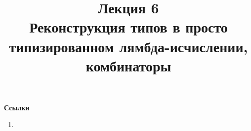 \documentclass[12pt, a4paper]{article}
\begin{document}
	\begin{titlepage}
		\title{Лекция 6 \\ Реконструкция типов в просто типизированном лямбда-исчислении, комбинаторы}
		\date{}
	\end{titlepage}
		\maketitle
\textbf{Ссылки}
\begin{enumerate}
	\item
\end{enumerate}
\end{document}
